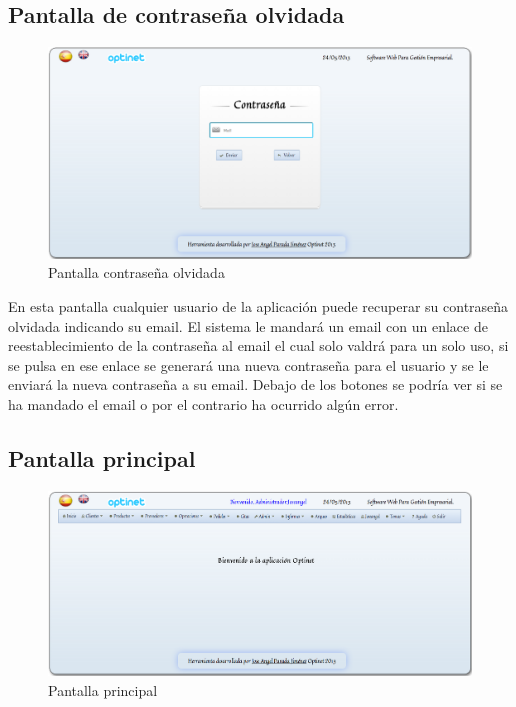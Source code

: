 \documentclass[a4paper,11pt]{book}
\begin{document}
\newpage
\subsection {Pantalla de contraseña olvidada}

\begin{figure}[!htb]
  \centering
    \includegraphics[scale=0.35]{capolvidada.png}
  \caption{Pantalla contraseña olvidada}
  \label{a}
\end{figure}

En esta pantalla cualquier usuario de la aplicación puede recuperar su contraseña olvidada indicando su email. El sistema le mandará un email con un enlace de reestablecimiento de la contraseña al email el cual solo valdrá para un solo uso, si se pulsa en ese enlace se generará una nueva contraseña para el usuario y se le enviará la nueva contraseña a su email. Debajo de los botones se podría ver si se ha mandado el email o por el contrario ha ocurrido algún error.

\newpage
\subsection {Pantalla principal}

\begin{figure}[!htb]
  \centering
    \includegraphics[scale=0.35]{capprincipal.png}
  \caption{Pantalla principal}
  \label{a}
\end{figure}
\end{document}
